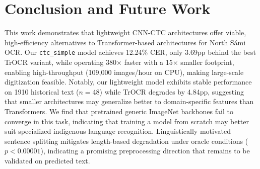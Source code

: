 \documentclass[conference]{IEEEtran}
\newcommand{\ctcCER}{12.24}
\newcommand{\speedupFactor}{380}
\newcommand{\bookTestSamples}{48}
\newcommand{\trocrSynthDeltaCER}{4.84}
\newcommand{\cerGap}{3.69}
\newcommand{\sizeRatio}{15}
\newcommand{\ctcThroughputK}{109}  %
\newcommand{\turiYear}{1910}
\begin{document}
\section{Conclusion and Future Work}
\label{sec:conclusion}

This work demonstrates that lightweight CNN-CTC architectures offer viable, high-efficiency alternatives to Transformer-based architectures for North S\'{a}mi OCR. Our \texttt{ctc\_simple} model achieves \ctcCER\% CER, only \cerGap{}pp behind the best TrOCR variant, while operating \speedupFactor$\times$ faster with a \sizeRatio$\times$ smaller footprint, enabling high-throughput (\ctcThroughputK{},000 images/hour on CPU), making large-scale digitization feasible. 
Notably, our lightweight model exhibits stable performance on \turiYear{} historical text ($n=$\bookTestSamples{}) while TrOCR degrades by \trocrSynthDeltaCER{}pp, suggesting that smaller architectures may generalize better to domain-specific features than Transformers. We find that pretrained generic ImageNet backbones fail to converge in this task, indicating that training a model from scratch may better suit specialized indigenous language recognition. Linguistically motivated sentence splitting mitigates length-based degradation under oracle conditions ($p < 0.00001$), indicating a promising preprocessing direction that remains to be validated on predicted text. 
\end{document}
